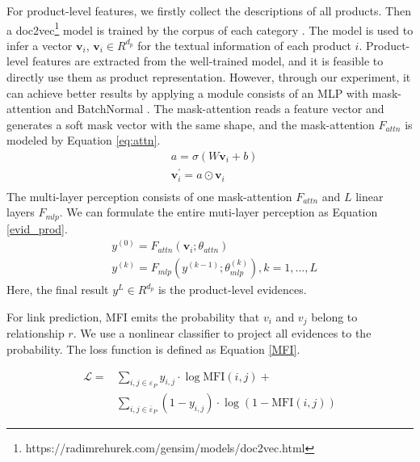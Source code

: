 \documentclass[review]{elsarticle}
\begin{document}
\begin{sloppypar}
For product-level features, we firstly collect the descriptions of all products.
Then a doc2vec\footnote{https://radimrehurek.com/gensim/models/doc2vec.html} model is trained by the corpus of each category \cite{le2014distributed_doc2vec}. The model is used to infer a vector $\mathbf v_{i}$, $\mathbf v_{i} \in R^{d_{p}}$ for the textual information of each product $i$. Product-level features are extracted from the well-trained model, and it is feasible to directly use them as product representation. However, through our experiment, it can achieve better results by applying a module consists of an MLP with mask-attention and BatchNormal \cite{DBLP:conf/nips/VaswaniSPUJGKP17Attention}. 
The mask-attention reads a feature vector and generates a soft mask vector with the same shape, and the mask-attention $F_{attn}$ is modeled by  Equation \ref{eq:attn}.
\begin{equation}\label{eq:attn}
    \begin{aligned}
    &a=\sigma\left(W \mathbf v_{i}+b\right) \\
    &\mathbf v_{i}^{'}=a\odot \mathbf v_{i}\\ 
\end{aligned}
\end{equation}
The multi-layer perception consists of one mask-attention $F_{attn}$ and $L$ linear layers $F_{mlp}$. We can formulate the entire muti-layer perception as Equation \ref{evid_prod}.
\begin{equation}\label{evid_prod}
\begin{aligned}
    &y^{\left(0 \right)}=F_{attn}\left(\mathbf v_{i}  ;\theta_{attn} \right)\\
    &y^{\left(k \right)}=F_{mlp}\left(y^{\left(k-1 \right)} ;\theta_{mlp}^{\left(k \right)}\right),k=1,...,L
\end{aligned}
\end{equation}
Here, the ﬁnal result $y^{L} \in R^{d_{p}}$ is the product-level evidences. 

For link prediction, MFI emits the probability that $v_{i}$ and $v_{j}$ belong to relationship $r$. We use a nonlinear classifier to project all evidences to the probability. The loss function is defined as Equation \ref{MFI}.

\begin{equation}\label{MFI}
\begin{aligned}
\mathcal{L}=&\sum_{i,j \in \varepsilon_{P}}{y_{i,j} \cdot \log \text{MFI}\left(i,j\right)}+\\
&\sum_{i,j \in \overline{\varepsilon}_{P}}{\left(1-y_{i,j}\right) \cdot \log \left(1-\text{MFI}\left(i,j\right)\right)}
\end{aligned}
\end{equation}


\end{sloppypar}
\end{document}
